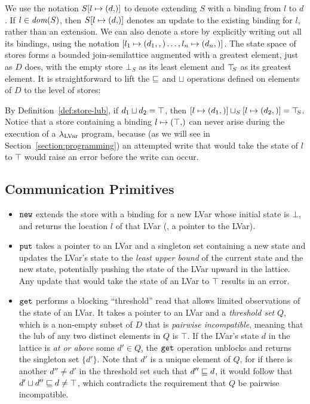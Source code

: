 \noindent We use the notation $\extS{S}{l}{d}$ to denote extending $S$
with a binding from $l$ to $d$.  If $l \in \mathit{dom}(S)$, then
$\extS{S}{l}{d}$ denotes an update to the existing binding for $l$,
rather than an extension.  We can also denote a store by explicitly
writing out all its bindings, using the notation
$\left[ l_1 \mapsto (d_1, ,) \dots, l_n \mapsto (d_n, \right)]$.
The state space of stores forms a bounded join-semilattice augmented
with a greatest element, just as $D$ does, with the empty store
$\bot_S$ as its least element and $\top\hspace{-0.85mm}_{S}$ as its greatest element.  It
is straightforward to lift the $\sqsubseteq$ and $\sqcup$ operations
defined on elements of $D$ to the level of stores:

\DefLeqStore

\DefLubStore

\noindent By Definition~\ref{def:store-lub}, if $d_1 \sqcup d_2 =
\top$, then
$\left[ l \mapsto (d_1, \right)] \sqcup_{S} \left[ l \mapsto (d_2, \right)]
= \top\hspace{-0.85mm}_{S}$.  Notice that a store containing a binding
$\storebinding{l}{\top}$ can never arise during the execution of a
$\lambda_{\textrm{LVar}}$ program, because (as we will see in
Section~\ref{section:programming}) an attempted write that would take
the state of $l$ to $\top$ would raise an error before the write can
occur.

\subsection{Communication Primitives}\label{subsection:putget}

\begin{itemize}
\item $\mbox{\texttt{new}}$ extends the store with a binding for a new LVar whose
  initial state is $\bot$, and returns the location $l$ of that LVar
  (\ie, a pointer to the LVar).
\item $\mbox{\texttt{put}}$ takes a pointer to an LVar and a singleton set containing
  a new state and updates the LVar's state to the {\em least upper
  bound} of the current state and the new state, potentially pushing
  the state of the LVar upward in the lattice.  Any update that would
  take the state of an LVar to $\top$ results in an error.
\item $\mbox{\texttt{get}}$ performs a blocking ``threshold'' read that allows
  limited observations of the state of an LVar.  It takes a pointer to
  an LVar and a \emph{threshold set} $Q$, which is a non-empty subset
  of $D$ that is \emph{pairwise incompatible}, meaning that the lub of
  any two distinct elements in $Q$ is $\top$.  If the LVar's state $d$
  in the lattice is {\em at or above} some $d' \in Q$, the $\mbox{\texttt{get}}$
  operation unblocks and returns the singleton set $\lbrace
  d' \rbrace$.  Note that $d'$ is a unique element of $Q$, for if
  there is another $d'' \neq d'$ in the threshold set such that
  $d'' \sqsubseteq d$, it would follow that $d' \sqcup d'' \sqsubseteq
  d \neq \top$, which contradicts the requirement that $Q$ be pairwise
  incompatible.
\end{itemize}

